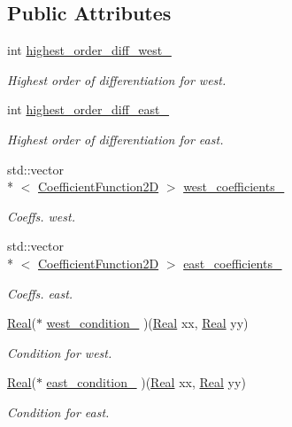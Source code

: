 \subsection*{Public Attributes}
\begin{DoxyCompactItemize}
\item 
int \hyperlink{classmtk_1_1BCDescriptor1D_a18ac9c75ffd5af33366c0c43c8191cf2}{highest\+\_\+order\+\_\+diff\+\_\+west\+\_\+}
\begin{DoxyCompactList}\small\item\em Highest order of differentiation for west. \end{DoxyCompactList}\item 
int \hyperlink{classmtk_1_1BCDescriptor1D_a8a1190eb88ba70e1e98b0905e11631db}{highest\+\_\+order\+\_\+diff\+\_\+east\+\_\+}
\begin{DoxyCompactList}\small\item\em Highest order of differentiation for east. \end{DoxyCompactList}\item 
std\+::vector\\*
$<$ \hyperlink{group__c07-mim__ops_gad9e1c0ace886b0029aefffa5f320e852}{Coefficient\+Function2\+D} $>$ \hyperlink{classmtk_1_1BCDescriptor1D_a0d4c145da23dd5eaacebd17ee421c0a6}{west\+\_\+coefficients\+\_\+}
\begin{DoxyCompactList}\small\item\em Coeffs. west. \end{DoxyCompactList}\item 
std\+::vector\\*
$<$ \hyperlink{group__c07-mim__ops_gad9e1c0ace886b0029aefffa5f320e852}{Coefficient\+Function2\+D} $>$ \hyperlink{classmtk_1_1BCDescriptor1D_af29b1f07614f7fc05032b0be8838fe7b}{east\+\_\+coefficients\+\_\+}
\begin{DoxyCompactList}\small\item\em Coeffs. east. \end{DoxyCompactList}\item 
\hyperlink{group__c01-roots_gac080bbbf5cbb5502c9f00405f894857d}{Real}($\ast$ \hyperlink{classmtk_1_1BCDescriptor1D_a2e2c621083756cc2c47b981302485836}{west\+\_\+condition\+\_\+} )(\hyperlink{group__c01-roots_gac080bbbf5cbb5502c9f00405f894857d}{Real} xx, \hyperlink{group__c01-roots_gac080bbbf5cbb5502c9f00405f894857d}{Real} yy)
\begin{DoxyCompactList}\small\item\em Condition for west. \end{DoxyCompactList}\item 
\hyperlink{group__c01-roots_gac080bbbf5cbb5502c9f00405f894857d}{Real}($\ast$ \hyperlink{classmtk_1_1BCDescriptor1D_a828e318e90b255e2ebf0ad7495e4fe32}{east\+\_\+condition\+\_\+} )(\hyperlink{group__c01-roots_gac080bbbf5cbb5502c9f00405f894857d}{Real} xx, \hyperlink{group__c01-roots_gac080bbbf5cbb5502c9f00405f894857d}{Real} yy)
\begin{DoxyCompactList}\small\item\em Condition for east. \end{DoxyCompactList}\end{DoxyCompactItemize}


